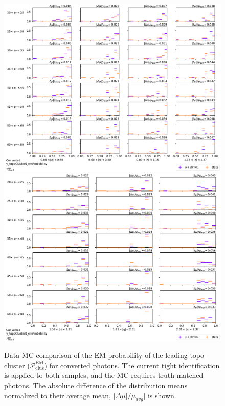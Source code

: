\begin{figure}[!thp]
    \centering
    \includegraphics[width=.74\textwidth]{appendices/datamc_images/y_topoCluster0_emProbability_Converted_lowerEta.pdf}
    \includegraphics[width=.74\textwidth]{appendices/datamc_images/y_topoCluster0_emProbability_Converted_upperEta.pdf}
    \caption[Data-MC comparison of the \gls{EM} probability of the leading topo-cluster ($\mathcal{P}_{\text{clus}}^{\text{EM}}$)or converted photons]{Data-MC comparison of the \gls{EM} probability of the leading topo-cluster ($\mathcal{P}_{\text{clus}}^{\text{EM}}$) for converted photons. The current tight identification is applied to both samples, and the \gls{MC} requires truth-matched photons. The absolute difference of the distribution means normalized to their average mean, $|\Delta \mu|/\mu_{avg}|$ is shown.}
    \label{fig:dmc-c-emp}
\end{figure}